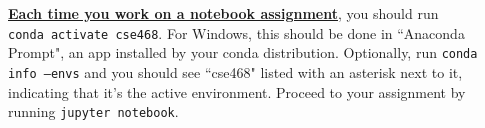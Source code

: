 \documentclass[12pt]{article}
\begin{document}
\textbf{\underline{Each time you work on a notebook assignment}}, you should run \\ \texttt{conda activate cse468}. For Windows, this should be done in ``Anaconda Prompt", an app installed by your conda distribution. Optionally, run \texttt{conda info --envs} and you should see ``cse468" listed with an asterisk next to it, indicating that it's the active environment. Proceed to your assignment by running \texttt{jupyter notebook}.



\end{document}
